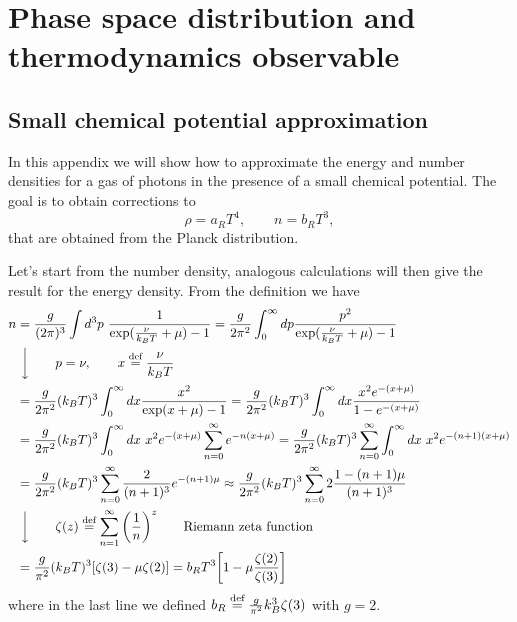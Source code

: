 \section{Phase space distribution and thermodynamics observable}
\subsection{Small chemical potential approximation}
\label{sec:SmallChemicalPotential}
In this appendix we will show how to approximate the energy and number densities for a gas of photons in the presence of a small chemical potential.
The goal is to obtain corrections to  
$$\rho=a_RT^4,\qquad n=b_RT^3,$$ that are obtained from the Planck distribution.

Let's start from the number density, analogous calculations will then give the result for the energy density. From the definition we have
\begin{align}
    n&=\frac{g}{(2\pi)^3}\int d^3p\ \frac{1}{\exp(\frac{\nu}{k_BT}+\mu)-1}=\frac{g}{2\pi^2}\int_0^\infty dp \frac{p^2 }{\exp(\frac{\nu}{k_BT}+\mu)-1}\nonumber\\&\ \bigg\downarrow\qquad p=\nu,\qquad x\defeq\frac{\nu}{k_BT}\nonumber\\
    &=\frac{g}{2\pi^2}(k_BT)^3\int_0^\infty dx \frac{x^2}{\exp(x+\mu)-1}=\frac{g}{2\pi^2}(k_BT)^3\int_0^\infty dx \frac{x^2e^{-(x+\mu)}}{1-e^{-(x+\mu)}}\nonumber\\&=\frac{g}{2\pi^2}(k_BT)^3\int_0^\infty dx\ x^2e^{-(x+\mu)}\sum_{n=0}^{\infty}e^{-n(x+\mu)}=\frac{g}{2\pi^2}(k_BT)^3\sum_{n=0}^{\infty}\int_0^\infty dx\ x^2e^{-(n+1)(x+\mu)}\nonumber\\&=\frac{g}{2\pi^2}(k_BT)^3\sum_{n=0}^{\infty}\frac{2}{(n+1)^3}e^{-(n+1)\mu}\approx\frac{g}{2\pi^2}(k_BT)^3\sum_{n=0}^{\infty}2\frac{1-(n+1)\mu}{(n+1)^3}\nonumber\\&\ \bigg \downarrow\qquad \zeta(z)\defeq\sum_{n=1}^\infty\bigg(\frac{1}{n}\bigg)^z\qquad\text{Riemann zeta function}\nonumber\\
    &=\frac{g}{\pi^2}(k_BT)^3[\zeta(3)-\mu\zeta(2)]=b_RT^3\bigg[1-\mu\frac{\zeta(2)}{\zeta(3)}\bigg]\,\label{eq:SmallChemicalPotential_n}
\end{align}
where in the last line we defined $b_R\stackrel{\text{def}}{=}\frac{g}{\pi^2}k_B^3\zeta(3)$ with $g=2$.

